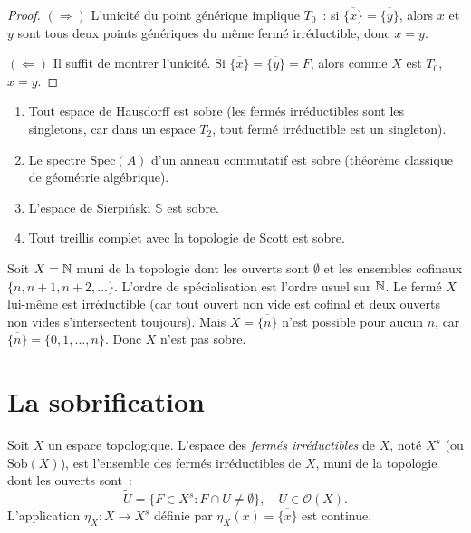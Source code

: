 \begin{proof}
$(\Rightarrow)$ L'unicit\'e du point g\'en\'erique implique $T_0$~: si
$\overline{\{x\}} = \overline{\{y\}}$, alors $x$ et $y$ sont tous deux points
g\'en\'eriques du m\^eme ferm\'e irr\'eductible, donc $x = y$.

$(\Leftarrow)$ Il suffit de montrer l'unicit\'e. Si $\overline{\{x\}} = \overline{\{y\}} = F$,
alors comme $X$ est $T_0$, $x = y$.
\end{proof}

\begin{exemple}
\begin{enumerate}
  \item Tout espace de Hausdorff est sobre (les ferm\'es irr\'eductibles sont les
    singletons, car dans un espace $T_2$, tout ferm\'e irr\'eductible est un singleton).
  \item Le spectre $\mathrm{Spec}(A)$ d'un anneau commutatif est sobre (th\'eor\`eme
    classique de g\'eom\'etrie alg\'ebrique).
  \item L'espace de Sierpi\'nski $\mathbb{S}$ est sobre.
  \item Tout treillis complet avec la topologie de Scott est sobre.
\end{enumerate}
\end{exemple}

\begin{exemple}
Soit $X = \mathbb{N}$ muni de la topologie dont les ouverts sont $\emptyset$ et les ensembles
cofinaux $\{n, n+1, n+2, \ldots\}$. L'ordre de sp\'ecialisation est l'ordre usuel sur
$\mathbb{N}$. Le ferm\'e $X$ lui-m\^eme est irr\'eductible (car tout ouvert non vide est cofinal
et deux ouverts non vides s'intersectent toujours). Mais $X = \overline{\{n\}}$ n'est
possible pour aucun $n$, car $\overline{\{n\}} = \{0, 1, \ldots, n\}$. Donc $X$ n'est
pas sobre.
\end{exemple}

\section{La sobrification}

\begin{definition}[Sobrification]
Soit $X$ un espace topologique. L'espace des \emph{ferm\'es irr\'eductibles} de $X$,
not\'e $X^s$ (ou $\mathrm{Sob}(X)$), est l'ensemble des ferm\'es irr\'eductibles de $X$,
muni de la topologie dont les ouverts sont~:
\[
  \tilde{U} = \{F \in X^s : F \cap U \neq \emptyset\}, \quad U \in \mathcal{O}(X).
\]
L'application $\eta_X\colon X \to X^s$ d\'efinie par $\eta_X(x) = \overline{\{x\}}$ est
continue.
\end{definition}

